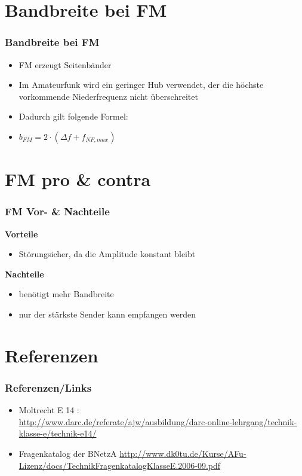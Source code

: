 \section*{Bandbreite bei FM}
\begin{frame}
\frametitle{Bandbreite bei FM}
\begin{itemize}
	\item FM erzeugt Seitenbänder
	\item Im Amateurfunk wird ein geringer Hub verwendet, der die höchste vorkommende Niederfrequenz nicht überschreitet
	\item Dadurch gilt folgende Formel:
	\item \LARGE{$b_{FM} = 2 \cdot (\Delta f + f_{NF,max})$}
\end{itemize}
\end{frame}


\section*{FM pro \& contra}
\begin{frame}
\frametitle{FM Vor- \& Nachteile}
\textbf{\Large{Vorteile}}
\begin{itemize}
	\item Störungsicher, da die Amplitude konstant bleibt 
\end{itemize}
\vspace{1cm}
\textbf{\Large{Nachteile}}
\begin{itemize}
	\item benötigt mehr Bandbreite
	\item nur der stärkste Sender kann empfangen werden
\end{itemize}
\end{frame}


\section*{Referenzen}
\begin{frame}
    \frametitle{Referenzen/Links}
    
    \footnotesize
    \begin{itemize}
        \item Moltrecht E 14 : \\
              \url{http://www.darc.de/referate/ajw/ausbildung/darc-online-lehrgang/technik-klasse-e/technik-e14/}
		\item Fragenkatalog der BNetzA
			\url{http://www.dk0tu.de/Kurse/AFu-Lizenz/docs/TechnikFragenkatalogKlasseE.2006-09.pdf}
    \end{itemize}

\end{frame}


